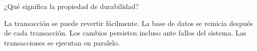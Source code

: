 \question[1] ¿Qué significa la propiedad de durabilidad?
\begin{choices}
\choice La transacción se puede revertir fácilmente.
\choice La base de datos se reinicia después de cada transacción.
\CorrectChoice Los cambios persisten incluso ante fallos del sistema.
\choice Las transacciones se ejecutan en paralelo.
\end{choices}